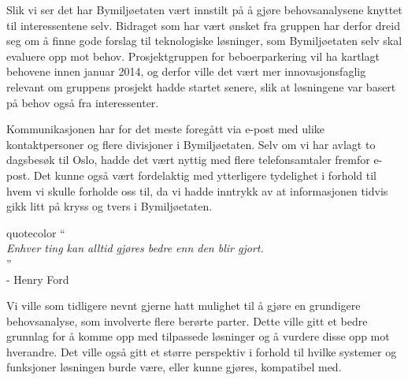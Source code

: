 \documentclass[xetex]{beamer}
\begin{document}
\begin{frame}
	Slik vi ser det har Bymiljøetaten vært innstilt på å gjøre \alert{behovsanalysene} knyttet til \alert{interessentene} selv. Bidraget som har vært ønsket fra gruppen har derfor dreid seg om å finne gode forslag til teknologiske løsninger, som Bymiljøetaten selv skal evaluere opp mot behov. Prosjektgruppen for beboerparkering vil ha kartlagt behovene \alert{innen januar 2014}, og derfor ville det vært mer innovasjonsfaglig relevant om gruppens prosjekt hadde startet senere, slik at løsningene var basert på behov også fra interessenter. 

	\alert{Kommunikasjonen} har for det meste foregått via e-post med ulike kontaktpersoner og 
flere divisjoner i Bymiljøetaten. Selv om vi har avlagt to dagsbesøk til Oslo, hadde det vært nyttig med flere telefonsamtaler fremfor e-post. Det kunne også vært fordelaktig med ytterligere \alert{tydelighet} i forhold til hvem vi skulle forholde oss til, da vi hadde inntrykk av at informasjonen tidvis gikk litt på kryss og tvers i Bymiljøetaten.

	\vspace{1.5em}
	\hspace{11em}\begin{beamercolorbox}[wd=0.50\paperwidth, ht=10ex, dp=6pt, leftskip=.3cm, rightskip=.3cm]{quotecolor}
		\huge`` \\[-0.5em]
		\tiny
		\hspace{1.5em}\vspace{0.0em}\emph{Enhver ting kan alltid gjøres bedre enn den blir gjort.} \\ [-1.8em]
		
		\hspace{0.43\paperwidth}\huge'' \\ [-0.3em]
		
		\hfill\tiny- Henry Ford \\ [1em]
	\end{beamercolorbox}
	
	\vspace{1.5em}
	
	Vi ville som tidligere nevnt gjerne hatt mulighet til å gjøre en \alert{grundigere behovsanalyse}, som involverte flere berørte parter. Dette ville gitt et bedre grunnlag for å komme opp med tilpassede løsninger og å vurdere disse opp mot hverandre. Det ville også gitt et større \alert{perspektiv} i forhold til hvilke systemer og funksjoner løsningen burde være, eller kunne gjøres, kompatibel med. 
\end{frame}
\end{document}
